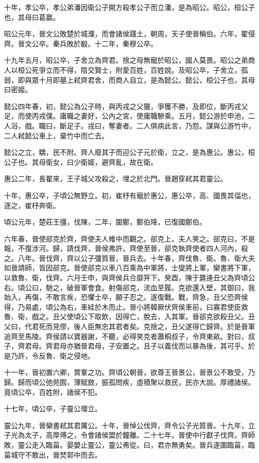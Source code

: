 十年，孝公卒，孝公弟潘因衛公子開方殺孝公子而立潘，是為昭公。昭公，桓公子也，其母曰葛嬴。

昭公元年，晉文公敗楚於城濮，而會諸侯踐土，朝周，天子使晉稱伯。六年，翟侵齊。晉文公卒。秦兵敗於殽。十二年，秦穆公卒。

十九年五月，昭公卒，子舍立為齊君。捨之母無寵於昭公，國人莫畏。昭公之弟商人以桓公死爭立而不得，陰交賢士，附愛百姓，百姓說。及昭公卒，子舍立，孤弱，即與眾十月即墓上弒齊君舍，而商人自立，是為懿公。懿公，桓公子也，其母曰密姬。

懿公四年春，初，懿公為公子時，與丙戎之父獵，爭獲不勝，及即位，斷丙戎父足，而使丙戎僕。庸職之妻好，公內之宮，使庸職驂乘。五月，懿公游於申池，二人浴，戲。職曰，斷足子。戎曰，奪妻者。二人俱病此言，乃怨。謀與公游竹中，二人弒懿公車上，棄竹中而亡去。

懿公之立，驕，民不附。齊人廢其子而迎公子元於衛，立之，是為惠公。惠公，桓公子也。其母衛女，曰少衛姬，避齊亂，故在衛。

惠公二年，長翟來，王子城父攻殺之，埋之於北門。晉趙穿弒其君靈公。

十年，惠公卒，子頃公無野立。初，崔杼有寵於惠公，惠公卒，高、國畏其偪也，逐之，崔杼奔衛。

頃公元年，楚莊王彊，伐陳，二年，圍鄭，鄭伯降，已復國鄭伯。

六年春，晉使郤克於齊，齊使夫人帷中而觀之。郤克上，夫人笑之。郤克曰，不是報，不復涉河。歸，請伐齊，晉侯弗許。齊使至晉，郤克執齊使者四人河內，殺之。八年。晉伐齊，齊以公子彊質晉，晉兵去。十年春，齊伐魯、衛。魯、衛大夫如晉請師，皆因郤克。晉使郤克以車八百乘為中軍將，士燮將上軍，欒書將下軍，以救魯、衛，伐齊。六月壬申，與齊侯兵合靡笄下。癸酉，陳于礱逄丑父為齊頃公右。頃公曰，馳之，破晉軍會食。射傷郤克，流血至履。克欲還入壁，其御曰，我始入，再傷，不敢言疾，恐懼士卒，願子忍之。遂復戰。戰，齊急，丑父恐齊侯得，乃易處，頃公為右，車絓於木而止。晉小將韓厥伏齊侯車前，曰寡君使臣救魯、衛，戲之。丑父使頃公下取飲，因得亡，脫去，入其軍。晉郤克欲殺丑父。丑父曰，代君死而見僇，後人臣無忠其君者矣。克捨之，丑父遂得亡歸齊。於是晉軍追齊至馬陵。齊侯請以寶器謝，不聽，必得笑克者蕭桐叔子，令齊東畝。對曰，叔子，齊君母。齊君母亦猶晉君母，子安置之。且子以義伐而以暴為後，其可乎。於是乃許，令反魯、衛之侵地。

十一年，晉初置六卿，賞鞌之功。齊頃公朝晉，欲尊王晉景公，晉景公不敢受，乃歸。歸而頃公弛苑囿，薄賦斂，振孤問疾，虛積聚以救民，民亦大說。厚禮諸侯。竟頃公卒，百姓附，諸侯不犯。

十七年，頃公卒，子靈公環立。

靈公九年，晉欒書弒其君厲公。十年，晉悼公伐齊，齊令公子光質晉。十九年，立子光為太子，高厚傅之，令會諸侯盟於鐘離。二十七年，晉使中行獻子伐齊。齊師敗，靈公走入臨菑。晏嬰止靈公，靈公弗從。曰，君亦無勇矣。晉兵遂圍臨菑，臨菑城守不敢出，晉焚郭中而去。

